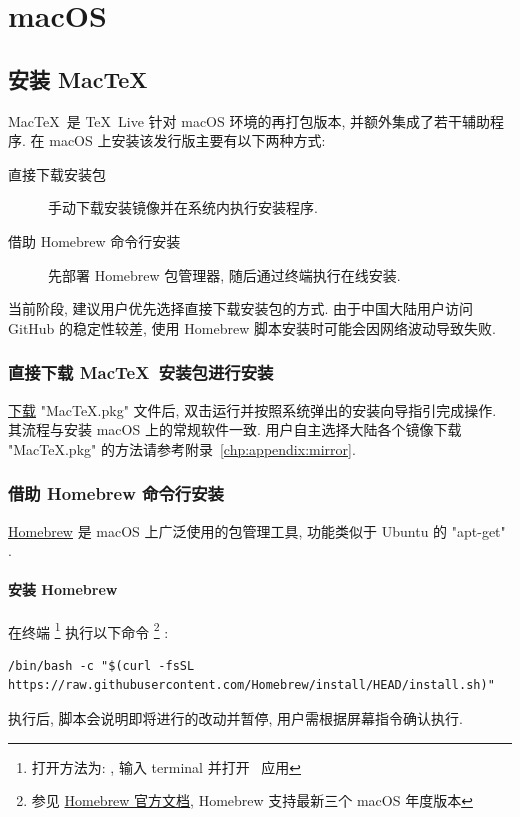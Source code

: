 
\chapter{macOS}\label{chap:macOS}

\section{安装 Mac\TeX}

Mac\TeX\ 是 \TeX~Live 针对 macOS 环境的再打包版本,
并额外集成了若干辅助程序.
在 macOS 上安装该发行版主要有以下两种方式:
\begin{description}
  \item[直接下载安装包]
  手动下载安装镜像并在系统内执行安装程序.
  \item[借助 Homebrew 命令行安装]
  先部署 Homebrew 包管理器,
  随后通过终端执行在线安装.
\end{description}

当前阶段,
建议用户优先选择直接下载安装包的方式.
由于中国大陆用户访问 GitHub 的稳定性较差,
使用 Homebrew 脚本安装时可能会因网络波动导致失败.

\subsection{直接下载 Mac\TeX\ 安装包进行安装}

\href{https://mirror.ctan.org/systems/mac/mactex/MacTeX.pkg}{下载} "MacTeX.pkg" 文件后,
双击运行并按照系统弹出的安装向导指引完成操作.
其流程与安装 macOS 上的常规软件一致.
用户自主选择大陆各个镜像下载 "MacTeX.pkg" 的方法请参考附录~\ref{chp:appendix:mirror}.

\subsection{借助 Homebrew 命令行安装}

\href{https://brew.sh/}{Homebrew} 是 macOS 上广泛使用的包管理工具,
功能类似于 Ubuntu 的 "apt-get" .

\subsubsection{安装 Homebrew}

在\textsf{终端}%
\footnote{打开方法为: \keys{\cmdmac + \SPACE},
输入 \textsf{terminal} 并打开\  应用}%
执行以下命令%
\footnote{参见
\href{https://docs.brew.sh/Installation}{Homebrew 官方文档},
Homebrew 支持最新三个 macOS 年度版本}
:
\begin{lstlisting}[deleteemph = bash]
  /bin/bash -c "$(curl -fsSL https://raw.githubusercontent.com/Homebrew/install/HEAD/install.sh)"
\end{lstlisting}
执行后,
脚本会说明即将进行的改动并暂停,
用户需根据屏幕指令确认执行.

